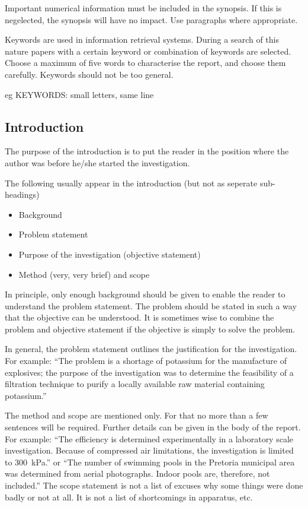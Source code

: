 \documentclass[a5paper, 10pt]{article}
\begin{document}
Important numerical information must be included in the synopsis.  
If this is negelected, the synopsis will have no impact.
Use paragraphs where appropriate.

Keywords are used in information retrieval systems.  
During a search of this nature papers with a certain keyword or combination of
keywords are selected.  
Choose a maximum of five words to characterise the report, and choose them carefully.  
Keywords should not be too general.

eg KEYWORDS:   small letters, same line

\subsection{Introduction}
\label{sec:introduction}
The purpose of the introduction is to put the reader in the position
where the author was before he/she started the investigation.

The following usually appear in the introduction (but not as seperate sub-headings)
\begin{itemize}
\item Background
\item Problem statement
\item Purpose of the investigation (objective statement)
\item Method (very, very brief) and scope
\end{itemize}

In principle, only enough background should be given to enable the
reader to understand the problem statement.  The problem should be
stated in such a way that the objective can be understood.  It is
sometimes wise to combine the problem and objective statement if the
objective is simply to solve the problem.

In general, the problem statement outlines the justification for the
investigation.  For example: ``The problem is a shortage of potassium
for the manufacture of explosives; the purpose of the investigation
was to determine the feasibility of a filtration technique to purify a
locally available raw material containing potassium.''

The method and scope are mentioned only.  For that no
more than a few sentences will be required.  Further details can be
given in the body of the report.  For example: ``The efficiency is
determined experimentally in a laboratory scale investigation.
Because of compressed air limitations, the investigation is limited to
\SI{300}{\kilo\pascal}.''  or ``The number of swimming pools in the Pretoria
municipal area was determined from aerial photographs.  Indoor pools
are, therefore, not included.''  The scope statement is not a
list of excuses why some things were done badly or not at all.  It is
not a list of shortcomings in apparatus, etc.
\end{document}
